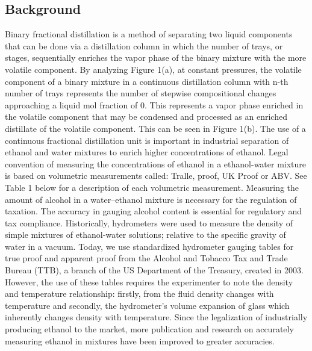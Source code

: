 \documentclass[peerreview, a4paper, 12pt]{IEEEtran}
\begin{document}
\subsection{\textbf{Background}}
Binary fractional distillation is a method of separating two liquid components that can be done via a distillation column in which the number of trays, or stages, sequentially enriches the vapor phase of the binary mixture with the more volatile component. By analyzing Figure 1(a), at constant pressures, the volatile component of a binary mixture in a continuous distillation column with n-th number of trays represents the number of stepwise compositional changes approaching a liquid mol fraction of 0. This represents a vapor phase enriched in the volatile component that may be condensed and processed as an enriched distillate of the volatile component. This can be seen in Figure 1(b). The use of a continuous fractional distillation unit is important in industrial separation of ethanol and water mixtures to enrich higher concentrations of ethanol. Legal convention of measuring the concentrations of ethanol in a ethanol-water mixture is based on volumetric measurements called: Tralle, proof, UK Proof or ABV. See Table 1 below for a description of each volumetric measurement. Measuring the amount of alcohol in a water–ethanol mixture is necessary for the regulation of taxation. The accuracy in gauging alcohol content is essential for regulatory and tax compliance. Historically, hydrometers were used to measure the density of simple mixtures of ethanol-water solutions; relative to the specific gravity of water in a vacuum. Today, we use standardized hydrometer gauging tables for true proof and apparent proof from the Alcohol and Tobacco Tax and Trade Bureau (TTB), a branch of the US Department of the Treasury, created in 2003. However, the use of these tables requires the experimenter to note the density and temperature relationship: firstly, from the fluid density changes with temperature and secondly, the hydrometer’s volume expansion of glass which inherently changes density with temperature.  Since the legalization of industrially producing ethanol to the market, more publication and research on accurately measuring ethanol in mixtures have been improved to greater accuracies.
\end{document}

